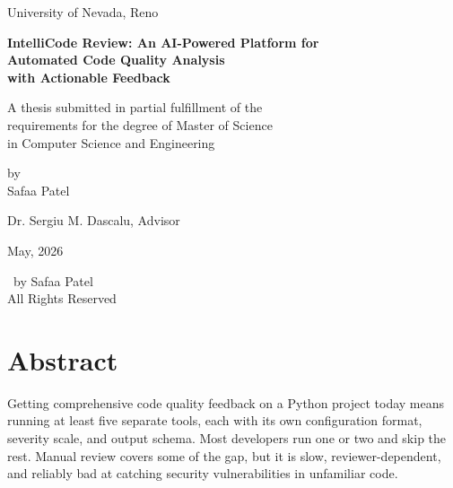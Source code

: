 \documentclass[12pt, oneside]{report}
\begin{document}
\begin{titlepage}
\begin{center}

{\Large University of Nevada, Reno}

\vfill

{\LARGE\bfseries IntelliCode Review: An AI-Powered Platform for\\
Automated Code Quality Analysis\\
with Actionable Feedback}

\vfill

{\large A thesis submitted in partial fulfillment of the\\
requirements for the degree of Master of Science\\
in Computer Science and Engineering}

\vfill

{\large by}\\[0.3em]
{\Large Safaa Patel}

\vfill

{\large Dr. Sergiu M. Dascalu, Advisor}

\vfill

{\large May, 2026}

\end{center}
\end{titlepage}

\clearpage
\thispagestyle{empty}
\vspace*{\fill}
\begin{center}
\textcopyright\ by Safaa Patel\\
All Rights Reserved
\end{center}
\vspace*{\fill}

\clearpage


\setcounter{page}{1}

\clearpage
\chapter*{Abstract}

Getting comprehensive code quality feedback on a Python project today means running at least five separate tools, each with its own configuration format, severity scale, and output schema. Most developers run one or two and skip the rest. Manual review covers some of the gap, but it is slow, reviewer-dependent, and reliably bad at catching security vulnerabilities in unfamiliar code.
\end{document}
